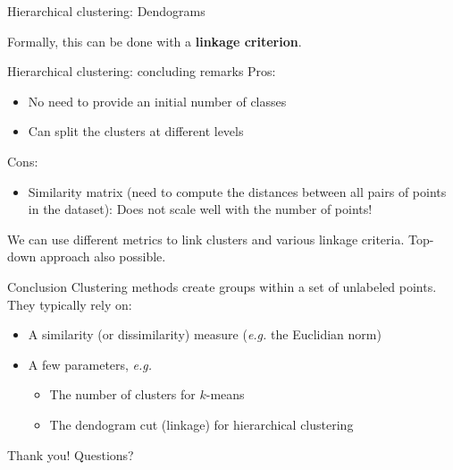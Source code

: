 \documentclass{beamer}
\begin{document}
\begin{frame}{Hierarchical clustering: Dendograms}
\vfill
\pause
Formally, this can be done with a \textbf{linkage criterion}.
\end{frame}

\begin{frame}{Hierarchical clustering: concluding remarks}
Pros:
\begin{itemize}
	\item No need to provide an initial number of classes
	\item Can split the clusters at different levels
\end{itemize}
\vfill
\pause
Cons:
\begin{itemize}
	\item Similarity matrix (need to compute the distances between all pairs of points in the dataset): Does not scale well with the number of points!
\end{itemize}
\vfill
\pause
We can use different metrics to link clusters and various linkage criteria.
\vfill
\pause
Top-down approach also possible.
\end{frame}

\begin{frame}{Conclusion}
Clustering methods create groups within a set of unlabeled points.
\vfill
\pause
They typically rely on:
\begin{itemize}
	\item A similarity (or dissimilarity) measure (\textit{e.g.} the Euclidian norm)
	\item A few parameters, \textit{e.g.}
	\begin{itemize}
		\item The number of clusters for $k$-means
		\item The dendogram cut (linkage) for hierarchical clustering
	\end{itemize}
\end{itemize}
\end{frame}

\begin{frame}
	\center
	\huge{Thank you! Questions?}
\end{frame}
\end{document}
